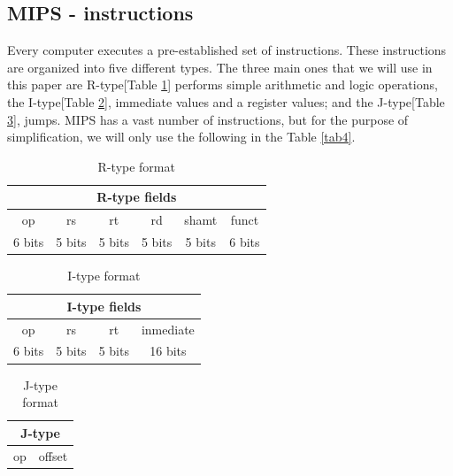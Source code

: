 \documentclass[conference]{IEEEtran}
\begin{document}
\subsection{MIPS - instructions}
Every computer executes a pre-established set of instructions. These instructions are organized into five different types. The three main ones that we will use in this paper are  R-type[Table \ref{tab1}] performs simple arithmetic and logic operations, the I-type[Table \ref{tab2}], immediate values and a register values; and the J-type[Table \ref{tab3}], jumps.
MIPS has a vast number of instructions, but for the purpose of simplification, we will only use the following in the Table \ref{tab4}.

    \begin{table}[htbp]
    \caption{R-type format}
    \begin{center}
    \begin{tabular}{|c|c|c|c|c|c|}
    \hline
    \multicolumn{6}{|c|}{R-type fields}                 \\ \hline
    op     & rs     & rt     & rd     & shamt  & funct  \\ \hline
    6 bits & 5 bits & 5 bits & 5 bits & 5 bits & 6 bits \\ \hline
    \end{tabular}
    \label{tab1}
    \end{center}
    \end{table}
    
    \begin{table}[htbp]
    \caption{I-type format}
    \begin{center}
    \begin{tabular}{|c|c|c|c|}
    \hline
    \multicolumn{4}{|c|}{I-type fields}  \\ \hline
    op     & rs     & rt     & inmediate \\ \hline
    6 bits & 5 bits & 5 bits & 16 bits   \\ \hline
    \end{tabular}
    \label{tab2}
    \end{center}
    \end{table}
    
    \begin{table}[htbp]
    \caption{J-type format}
    \begin{center}
    \begin{tabular}{|c|c|}
    \hline
    \multicolumn{2}{|c|}{J-type} \\ \hline
    op & offset \\ \hline
    \end{tabular}
    \label{tab3}
    \end{center}
    \end{table}
    
\end{document}
